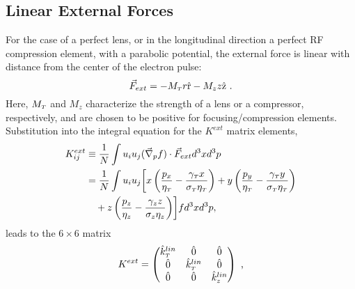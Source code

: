 \subsection{Linear External Forces}


For the case of a perfect lens, or in the longitudinal direction a perfect RF compression element, with a parabolic potential, the external force is linear with distance from the center of the electron pulse: 
\begin{equation} \label{eq:linear_force}
\vec{F}_{ext} = - M_{ {\scriptscriptstyle T} } r \hat{\operatorname{r}} - M_{z} z \hat{\operatorname{z}} \text{ .}
\end{equation}
Here, $M_{ {\scriptscriptstyle T} }$ and $M_{z}$ characterize the strength of a lens or a compressor, respectively, and are chosen to be positive for focusing/compression elements.
Substitution into the integral equation for the $ K^{ext} $ matrix elements,
\begin{equation}
 \begin{split} 
  K^{ext}_{ij} & \equiv \dfrac{1} {N} \int u_{i} u_{j} ( \vec{\nabla}_{p} f ) \cdot \vec{F}_{ext} d^{3} x d^{3} p \\ & = \dfrac{1} {N} \int u_{i} u_{j} \biggl[ x \left( \dfrac{ p_{x} } { \eta_{ {\scriptscriptstyle T} } } - \dfrac{ \gamma_{ {\scriptscriptstyle T} } x } { \sigma_{ {\scriptscriptstyle T} } \eta_{ {\scriptscriptstyle T} } } \right) + y \left( \dfrac{ p_{y} } { \eta_{ {\scriptscriptstyle T} } } - \dfrac{ \gamma_{ {\scriptscriptstyle T} } y } { \sigma_{ {\scriptscriptstyle T} } \eta_{ {\scriptscriptstyle T} } } \right) \\ & \quad + z \left( \dfrac{ p_{z} } { \eta_{z} } - \dfrac{ \gamma_{z} z } { \sigma_{z} \eta_{z} } \right) \biggr] f d^{3} x d^{3} p ,
 \end{split}
\end{equation}
leads to the $6\times6$ matrix
\begin{equation}
K^{ext} = 
\begin{pmatrix}
\hat{k}^{lin}_{{\scriptscriptstyle T}} & \hat{0} & \hat{0} \\
\hat{0} & \hat{k}^{lin}_{{\scriptscriptstyle T}} & \hat{0} \\
\hat{0} & \hat{0} & \hat{k}^{lin}_{z}
\end{pmatrix} \text{ ,}
\end{equation}
